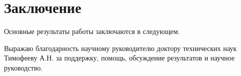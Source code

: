 \chapter*{Заключение}                       %


Основные результаты работы заключаются в следующем.



Выражаю благодарность научному руководителю доктору технических наук 
Тимофееву А.Н. за поддержку, помощь, обсуждение результатов и научное
руководство. 
